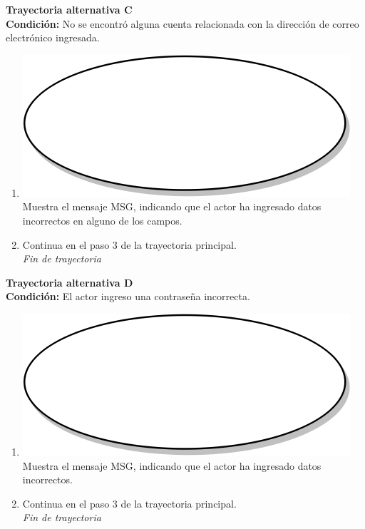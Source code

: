 \textbf{Trayectoria alternativa C} \label{cu1_ta_c}\\
\textbf{Condición:} No se encontró alguna cuenta relacionada con la dirección de correo electrónico ingresada.\\
 \begin{enumerate}[label=C\arabic*]
    \item {\includegraphics[scale=.05]{Capitulo3/img/proceso.png} Muestra el mensaje MSG, indicando que el actor ha ingresado datos incorrectos en alguno de los campos.}
    \item {Continua en el paso 3 de la trayectoria principal.} \\
    \textit{Fin de trayectoria} \\
\end{enumerate}

\textbf{Trayectoria alternativa D} \label{cu1_ta_d}\\
\textbf{Condición:} El actor ingreso una contraseña incorrecta.\\
 \begin{enumerate}[label=D\arabic*]
    \item {\includegraphics[scale=.05]{Capitulo3/img/proceso.png} Muestra el mensaje MSG, indicando que el actor ha ingresado datos incorrectos.}
    \item {Continua en el paso 3 de la trayectoria principal.} \\
    \textit{Fin de trayectoria} \\
\end{enumerate}

